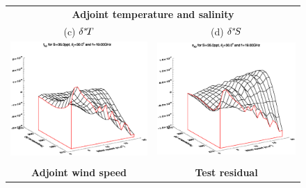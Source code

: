 \begin{figure}[htp]
\begin{tabular}{c c}
    \multicolumn{2}{c}{\sffamily\textbf{Adjoint temperature and salinity}}\\
    \textsf{(c)} $\delta^{*}\! T$ &
    \textsf{(d)} $\delta^{*}\! S$ \\
    \includegraphics[bb=115 240 508 540,clip,scale=0.5]{graphics/Model/TLAD/t_AD_s35.0ppt_z30.0_19.00GHz.eps} &
    \includegraphics[bb=110 240 508 540,clip,scale=0.5]{graphics/Model/TLAD/s_AD_s35.0ppt_z30.0_19.00GHz.eps} \\\\
    {\sffamily\textbf{Adjoint wind speed}} & {\sffamily\textbf{Test residual}} \\

\end{tabular}
\end{figure}
